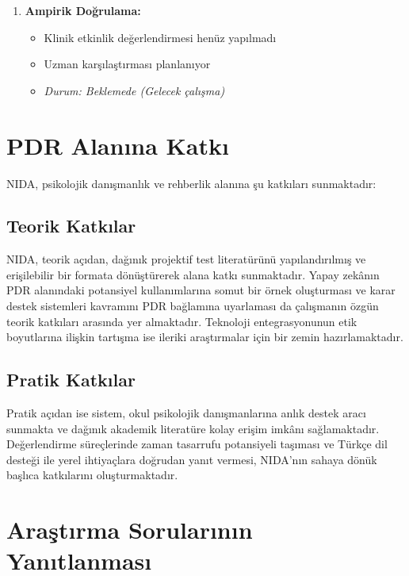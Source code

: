 \begin{enumerate}
  \item \textbf{Ampirik Doğrulama:}
  \begin{itemize}
    \item Klinik etkinlik değerlendirmesi henüz yapılmadı
    \item Uzman karşılaştırması planlanıyor
    \item \textit{Durum: Beklemede (Gelecek çalışma)}
  \end{itemize}
\end{enumerate}

\section{PDR Alanına Katkı}

NIDA, psikolojik danışmanlık ve rehberlik alanına şu katkıları sunmaktadır:

\subsection{Teorik Katkılar}

NIDA, teorik açıdan, dağınık projektif test literatürünü yapılandırılmış ve erişilebilir bir formata dönüştürerek alana katkı sunmaktadır. Yapay zekânın PDR alanındaki potansiyel kullanımlarına somut bir örnek oluşturması ve karar destek sistemleri kavramını PDR bağlamına uyarlaması da çalışmanın özgün teorik katkıları arasında yer almaktadır. Teknoloji entegrasyonunun etik boyutlarına ilişkin tartışma ise ileriki araştırmalar için bir zemin hazırlamaktadır.

\subsection{Pratik Katkılar}

Pratik açıdan ise sistem, okul psikolojik danışmanlarına anlık destek aracı sunmakta ve dağınık akademik literatüre kolay erişim imkânı sağlamaktadır. Değerlendirme süreçlerinde zaman tasarrufu potansiyeli taşıması ve Türkçe dil desteği ile yerel ihtiyaçlara doğrudan yanıt vermesi, NIDA'nın sahaya dönük başlıca katkılarını oluşturmaktadır.

\section{Araştırma Sorularının Yanıtlanması}

